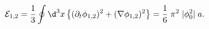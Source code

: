 \begin{equation}
{\mathcal E}_{1,2} = 
{1\over3} \oint \d^3 x \left\{ 
(\partial_t\phi_{1,2})^2 + (\nabla \phi_{1,2})^2 
\right\}
= {1\over 6} \; \pi^2 \; |\phi_0^2| \; a.
\end{equation}

